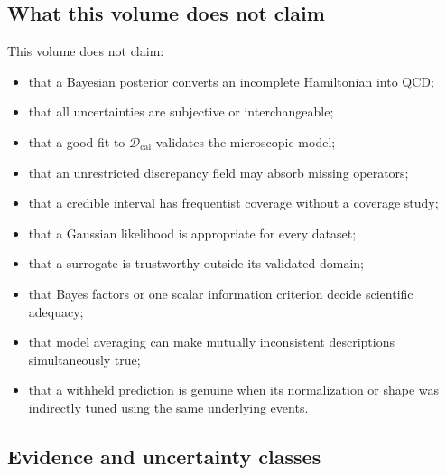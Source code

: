 \documentclass[11pt]{article}
\newcommand{\caldata}{\mathcal D_{\mathrm{cal}}}
\begin{document}
\subsection{What this volume does not claim}

This volume does not claim:
\begin{itemize}
\item that a Bayesian posterior converts an incomplete Hamiltonian into QCD;
\item that all uncertainties are subjective or interchangeable;
\item that a good fit to \(\caldata\) validates the microscopic model;
\item that an unrestricted discrepancy field may absorb missing operators;
\item that a credible interval has frequentist coverage without a coverage
      study;
\item that a Gaussian likelihood is appropriate for every dataset;
\item that a surrogate is trustworthy outside its validated domain;
\item that Bayes factors or one scalar information criterion decide scientific
      adequacy;
\item that model averaging can make mutually inconsistent descriptions
      simultaneously true;
\item that a withheld prediction is genuine when its normalization or shape
      was indirectly tuned using the same underlying events.
\end{itemize}

\subsection{Evidence and uncertainty classes}
\end{document}
